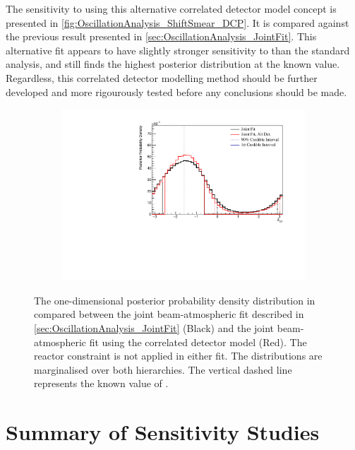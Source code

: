 The sensitivity to  using this alternative correlated detector model concept is presented in \autoref{fig:OscillationAnalysis_ShiftSmear_DCP}. It is compared against the previous result presented in \autoref{sec:OscillationAnalysis_JointFit}. This alternative fit appears to have slightly stronger sensitivity to  than the standard analysis, and still finds the highest posterior distribution at the known value. Regardless, this correlated detector modelling method should be further developed and more rigourously tested before any conclusions should be made.

\begin{figure}[h]
  \begin{subfigure}[t]{0.98\textwidth}
    \includegraphics[width=\textwidth, trim={0mm 0mm 0mm 0mm}, clip,page=1]{Figures/OA/JointFit_OA2020_AltDetModel/ContourComparison_1D_dcp_BH_2_woRC_UnSmeared_CredibleInterval.pdf}
  \end{subfigure}
  \caption{The one-dimensional posterior probability density distribution in  compared between the joint beam-atmospheric fit described in \autoref{sec:OscillationAnalysis_JointFit} (Black) and the joint beam-atmospheric fit using the correlated detector model (Red). The reactor constraint is not applied in either fit. The distributions are marginalised over both hierarchies. The vertical dashed line represents the known value of .}
  \label{fig:OscillationAnalysis_ShiftSmear_DCP}
\end{figure}

\clearpage
\section{Summary of Sensitivity Studies}
\label{sec:OA_Summary}

